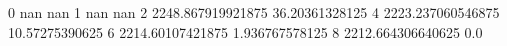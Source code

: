 0 nan nan
1 nan nan
2 2248.867919921875 36.20361328125
4 2223.237060546875 10.57275390625
6 2214.60107421875 1.936767578125
8 2212.664306640625 0.0
